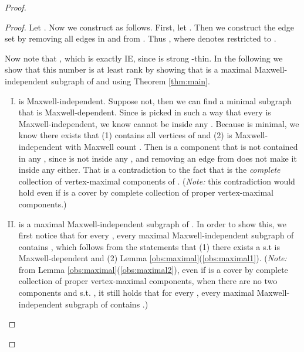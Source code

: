 \documentclass[10pt]{article}
\begin{document}
\begin{proof}
\begin{proof}
\begin{comment}
\begin{center}
\begin{figure}[h]
\begin{center}
\psfrag{Ci}{\huge }\psfrag{P1}{\huge }\psfrag{P2}{\huge
}\psfrag{P3}{\huge }\psfrag{P4}{\huge }
\texttt{[image: four\_part]}
\end{center}
\caption{Illustration of 4 parts of edges in  in the proof of Theorem \ref{thm:complete2thin}: the solid lines inside the circle
represent the edges that are in , and the dashed lines inside the circle
represent edges that are not in  but in . The solid lines outside the circle are present in all (other) 's where  contains . The dashed lines outside the circle are edges that are absent in exactly one   .}
\label{four_part}
\end{figure}
\end{center}
\end{comment}


Let . Now we construct  as follows. First, let . Then we construct the edge set  by removing all edges in  and  from . Thus     , where  denotes  restricted to .

Now note that     , which is exactly IE, since  is strong -thin.
In the following we show that this number is at least rank by showing that  is a maximal Maxwell-independent subgraph of  and using Theorem \ref{thm:main}.
\begin{enumerate}[(I)]

\item  is Maxwell-independent. Suppose not, then we can find a minimal subgraph  that is Maxwell-dependent. Since  is picked in such a way that every  is Maxwell-independent, we know  cannot be inside any . Because  is minimal, we know there exists  that (1) contains all vertices of  and (2) is Maxwell-independent with Maxwell count .
Then  is a component that is not contained in any , since  is not inside any , and removing an edge from  does not make it inside any  either. That is a contradiction to the fact that  is the {\em complete} collection of vertex-maximal components of . ({\em Note:} this contradiction would hold even if  is a cover by complete collection of proper vertex-maximal components.)

\item  is a maximal Maxwell-independent subgraph of . In order to show this, we first notice that for every , every maximal Maxwell-independent subgraph  of  contains , which follows from the statements that (1) there exists a  s.t  is Maxwell-dependent and (2) Lemma \ref{obs:maximal}(\ref{obs:maximal1}). ({\em Note:} from Lemma \ref{obs:maximal}(\ref{obs:maximal2}), even if  is a cover by complete collection of proper vertex-maximal components, when there are no two components  and  s.t.     , it still holds that for every , every maximal Maxwell-independent subgraph of  contains .)






\end{enumerate}
\end{proof}
\end{proof}
\end{document}
